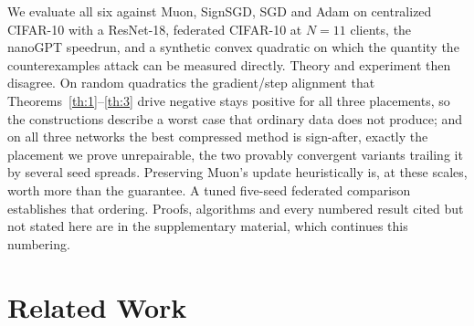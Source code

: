 We evaluate all six against Muon, SignSGD, SGD and Adam on centralized CIFAR-10 with a ResNet-18, federated CIFAR-10 at $N=11$ clients, the nanoGPT speedrun, and a synthetic convex quadratic on which the quantity the counterexamples attack can be measured directly. Theory and experiment then disagree. On random quadratics the gradient/step alignment that Theorems~\ref{th:1}--\ref{th:3} drive negative stays positive for all three placements, so the constructions describe a worst case that ordinary data does not produce; and on all three networks the best compressed method is sign-after, exactly the placement we prove unrepairable, the two provably convergent variants trailing it by several seed spreads. Preserving Muon's update heuristically is, at these scales, worth more than the guarantee. A tuned five-seed federated comparison establishes that ordering. Proofs, algorithms and every numbered result cited but not stated here are in the supplementary material, which continues this numbering.


\section{Related Work}\label{sec:relWork}
